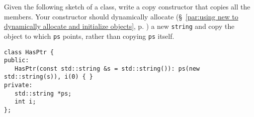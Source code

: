 %
%
\begin{question}\label{qst:hasptr first occurs}
Given the following sketch of a class, write a copy
constructor that copies all the members. Your constructor should dynamically
allocate (\S~\ref{par:using new to dynamically allocate and initialize objects}, p. \pageref{par:using new to dynamically allocate and initialize objects}) a new \verb|string| and copy the object to which \verb|ps|
points, rather than copying \verb|ps| itself.
\begin{lstlisting}
class HasPtr {
public:
   HasPtr(const std::string &s = std::string()): ps(new std::string(s)), i(0) { }
private:
   std::string *ps;
   int i;
};
\end{lstlisting}
\end{question}
